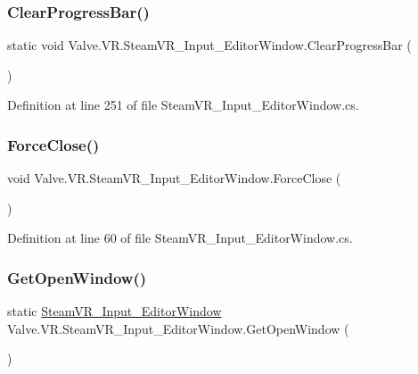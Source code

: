 \subsubsection{\texorpdfstring{ClearProgressBar()}{ClearProgressBar()}}
{\footnotesize\ttfamily static void Valve.\+V\+R.\+Steam\+V\+R\+\_\+\+Input\+\_\+\+Editor\+Window.\+Clear\+Progress\+Bar (\begin{DoxyParamCaption}{ }\end{DoxyParamCaption})\hspace{0.3cm}{\ttfamily [static]}}



Definition at line 251 of file Steam\+V\+R\+\_\+\+Input\+\_\+\+Editor\+Window.\+cs.

\mbox{\label{class_valve_1_1_v_r_1_1_steam_v_r___input___editor_window_a4bf70d50040dc00586252c9ccb53a98e}} 
\subsubsection{\texorpdfstring{ForceClose()}{ForceClose()}}
{\footnotesize\ttfamily void Valve.\+V\+R.\+Steam\+V\+R\+\_\+\+Input\+\_\+\+Editor\+Window.\+Force\+Close (\begin{DoxyParamCaption}{ }\end{DoxyParamCaption})}



Definition at line 60 of file Steam\+V\+R\+\_\+\+Input\+\_\+\+Editor\+Window.\+cs.

\mbox{\label{class_valve_1_1_v_r_1_1_steam_v_r___input___editor_window_af0349180cfb189626f90a5f8c8205d17}} 
\subsubsection{\texorpdfstring{GetOpenWindow()}{GetOpenWindow()}}
{\footnotesize\ttfamily static \mbox{\hyperlink{class_valve_1_1_v_r_1_1_steam_v_r___input___editor_window}{Steam\+V\+R\+\_\+\+Input\+\_\+\+Editor\+Window}} Valve.\+V\+R.\+Steam\+V\+R\+\_\+\+Input\+\_\+\+Editor\+Window.\+Get\+Open\+Window (\begin{DoxyParamCaption}{ }\end{DoxyParamCaption})\hspace{0.3cm}{\ttfamily [static]}}



